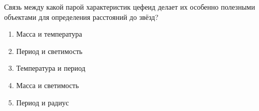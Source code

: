 Связь между какой парой характеристик цефеид делает их
особенно полезными объектами для определения расстояний до звёзд?

\begin{enumerate}[label=\alph*)]
  \item Масса и температура
  \item Период и светимость
  \item Температура и период
  \item Масса и светимость
  \item Период и радиус
\end{enumerate}
